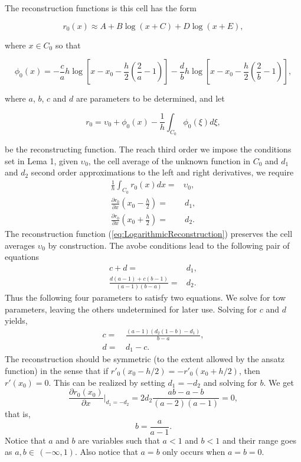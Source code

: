 \documentclass[10pt,a4paper]{article}
\newcommand{\pd}[2]{\frac{\partial #1}{\partial #2}}
\begin{document}
The reconstruction functions is this cell has the form
%
\begin{linenomath}
\begin{equation}
	r_0(x) \approx A + B\log(x+C)+ D\log(x+E),
\end{equation}
\end{linenomath}
%
where $x\in C_0$ so that 
%
\begin{linenomath}
\begin{equation}
	\phi_0(x) = 
	-\frac{c}{a} h\log\left[ x-x_0-\frac{h}{2}(\frac{2}{a}-1) \right] 
	-\frac{d}{b} h\log\left[ x-x_0-\frac{h}{2}(\frac{2}{b}-1) \right],
\end{equation}
\end{linenomath}
%
where $a$, $b$, $c$ and $d$ are parameters to be determined, and let 
%
\begin{linenomath}
\begin{equation}
	r_0 = \upsilon_0 + \phi_0(x) - \frac{1}{h} \int_{C_0} \phi_0(\xi) d\xi,
	\label{eq:LogarithmicReconstruction}
\end{equation}
\end{linenomath}
%
be the reconstructing function. 
%
The reach third order we impose the conditions set in Lema 1, given $\upsilon_0$, the cell average of the unknown function in $C_0$ and $d_1$ and $d_2$ second order approximations to the left and right derivatives, we require
%
\begin{align}
	\frac{1}{h} \int_{C_0} r_0(x)dx =& \upsilon_0, \\
	\pd{r_0}{x}\left(x_0-\frac{h}{2}\right) =&\,d_1, \\
	\pd{r_0}{x}\left(x_0+\frac{h}{2}\right) =&\,d_2.
\end{align}
%
The reconstruction function (\ref{eq:LogarithmicReconstruction}) preserves the cell averages $\upsilon_0$ by construction. The avobe conditions lead to the following pair of equations
%
\begin{align}
	c+d =& d_1, \\
	\frac{d(a-1)+c(b-1)}{(a-1)(b-a)} =& d_2.
\end{align}
%
Thus the following four parameters to satisfy two equations. We solve for tow parameters, leaving the others undetermined for later use. Solving for $c$ and $d$ yields,
%
\begin{align}
	c=& \,\frac{(a-1)(d_2(1-b)-d_1)}{b-a},\\
	d=& \,d_1-c.
\end{align}
%
The reconstruction should be symmetric (to the extent allowed by the ansatz function) in the sense that if $r'_0(x_0-h/2) = -r'_0(x_0+h/2)$, then $r'(x_0)=0$. This can be realized by setting $d_1=-d_2$ and solving for $b$. We get
%
\begin{equation}
	\pd{r_0(x_0)}{x}|_{d_1=-d_2} = 2d_2\frac{ab-a-b}{(a-2)(a-1)} = 0,
\end{equation}
%
that is,
%
\begin{equation}
	b = \frac{a}{a-1}.
\end{equation}
%
Notice that $a$ and $b$ are variables such that $a<1$ and $b<1$ and their range goes as ${a,b}\in\,(-\infty,1)$.  Also notice that $a=b$ only occurs when $a=b=0$.
\end{document}
